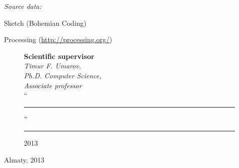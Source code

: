 \begin{titlepage}
    \emph{Source data:}
    
    \begin{compactitem}
    \item Sketch (Bohemian Coding)
    \item Processing (\url{http://processing.org/})
    \end{compactitem}


    \begin{figure}[ht]
            \begin{minipage}[t]{0.6\linewidth}
                {\bf Scientific supervisor}\\

                {\em Timur F. Umarov,\\
                Ph.D. Computer Science,\\
                Associate professor}\\
                
                ``\rule{2em}{0.4pt}'' \rule{8em}{0.4pt} 2013\\
         \end{minipage}
    \end{figure}
    
    \begin{center}
        \vfill
        Almaty, 2013
    \end{center}
  
    \end{titlepage}
